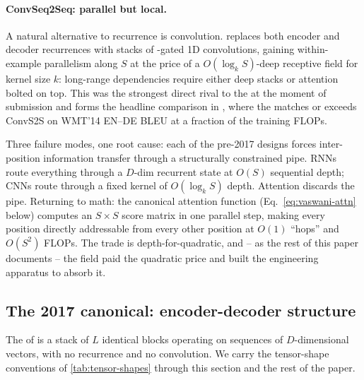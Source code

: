 \paragraph{ConvSeq2Seq: parallel but local.} A natural alternative
to recurrence is convolution.  replaces both encoder and decoder recurrences with stacks
of -gated 1D convolutions, gaining within-example parallelism
along $S$ at the price of a $O(\log_k S)$-deep receptive field for
kernel size $k$: long-range dependencies require either deep stacks
or attention bolted on top. This was the strongest direct rival to
the  at the moment of submission and forms the headline
comparison in \citet[Table~2]{vaswani2017}, where the 
matches or exceeds ConvS2S on WMT'14 EN--DE BLEU at a fraction of the
training FLOPs.

\begin{intuition}
Three failure modes, one root cause: each of the pre-2017 designs
forces inter-position information transfer through a structurally
constrained pipe. RNNs route everything through a $D$-dim recurrent
state at $O(S)$ sequential depth; CNNs route through a fixed kernel
of $O(\log_k S)$ depth. Attention discards the pipe. Returning to
math: the canonical attention function (Eq.~\eqref{eq:vaswani-attn}
below) computes an $S \times S$ score matrix in one parallel step,
making every position directly addressable from every other position
at $O(1)$ ``hops'' and $O(S^2)$ FLOPs. The trade is depth-for-quadratic,
and -- as the rest of this paper documents -- the field paid the
quadratic price and built the engineering apparatus to absorb it.
\end{intuition}

\subsection{The 2017 canonical: encoder-decoder structure}
\label{sec:canonical-structure}

The  of \citet{vaswani2017} is a stack of $L$ identical
blocks operating on sequences of $D$-dimensional vectors, with no
recurrence and no convolution. We carry the tensor-shape conventions
of \cref{tab:tensor-shapes} through this section and the rest of the
paper.

